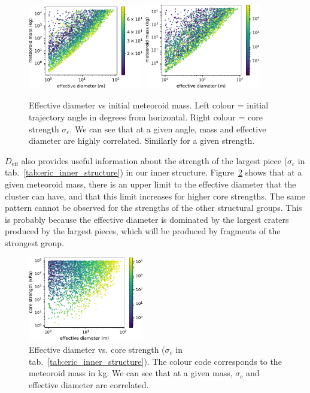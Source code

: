 \begin{figure}
    \centering
    \includegraphics[width=0.45\textwidth]{figures/d_eff_vs_mass}
    \includegraphics[width=0.45\textwidth]{figures/d_eff_vs_mass_strength}
    \caption{Effective diameter vs initial meteoroid mass. Left colour = initial trajectory angle in degrees from horizontal. Right colour = core strength $\sigma_c$. We can see that at a given angle, mass and effective diameter are highly correlated. Similarly for a given strength.}
    \label{fig:d_eff_vs_m}
\end{figure}

$D_\mathrm{eff}$ also provides useful information about the strength of the largest piece ($\sigma_c$ in tab.~\ref{tab:eric_inner_structure}) in our inner structure. Figure~\ref{fig:d_eff_vs_strength} shows that at a given meteoroid mass, there is an upper limit to the effective diameter that the cluster can have, and that this limit increases for higher core strengths.
The same pattern cannot be observed for the strengths of the other structural groups. This is probably because the effective diameter is dominated by the largest craters produced by the largest pieces, which will be produced by fragments of the strongest group.

\begin{figure}[htbp]
    \centering
    \includegraphics[width=0.45\textwidth]{figures/d_eff_vs_strength}
    \caption{Effective diameter vs. core strength ($\sigma_c$ in tab.~\ref{tab:eric_inner_structure}). The colour code corresponds to the meteoroid mass in kg. We can see that at a given mass, $\sigma_c$ and effective diameter are correlated.}
    \label{fig:d_eff_vs_strength}
\end{figure}

